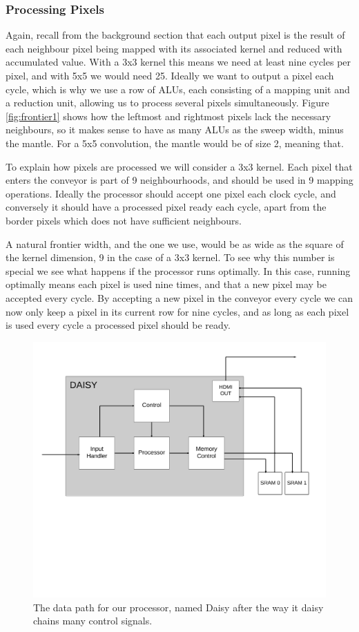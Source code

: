\subsubsection{Processing Pixels}
Again, recall from the background section that each output pixel is the result of each neighbour pixel being mapped with its associated kernel and reduced with accumulated value.
With a 3x3 kernel this means we need at least nine cycles per pixel, and with 5x5 we would need 25.
Ideally we want to output a pixel each cycle, which is why we use a row of ALUs, each consisting of a mapping unit and a reduction unit, allowing us to process several pixels simultaneously.
Figure \ref{fig:frontier1} shows how the leftmost and rightmost pixels lack the necessary neighbours, so it makes sense to have as many ALUs as the sweep width, minus the mantle.
For a 5x5 convolution, the mantle would be of size 2, meaning that.

To explain how pixels are processed we will consider a 3x3 kernel.
Each pixel that enters the conveyor is part of 9 neighbourhoods, and should be used in 9 mapping operations.
Ideally the processor should accept one pixel each clock cycle, and conversely it should have a processed pixel ready each cycle, apart from the border pixels which does not have sufficient neighbours.


A natural frontier width, and the one we use, would be as wide as the square of the kernel dimension, 9 in the case of a 3x3 kernel.
To see why this number is special we see what happens if the processor runs optimally.
In this case, running optimally means each pixel is used nine times, and that a new pixel may be accepted every cycle.
By accepting a new pixel in the conveyor every cycle we can now only keep a pixel in its current row for nine cycles, and as long as each pixel is used every cycle a processed pixel should be ready.

\begin{figure}[h!]
    \includegraphics[width=\linewidth]{img/daisy_overview.png}
    \caption{The data path for our processor, named Daisy after the way it daisy chains many control signals.}
    \label{fig:Convolution}
\end{figure}

